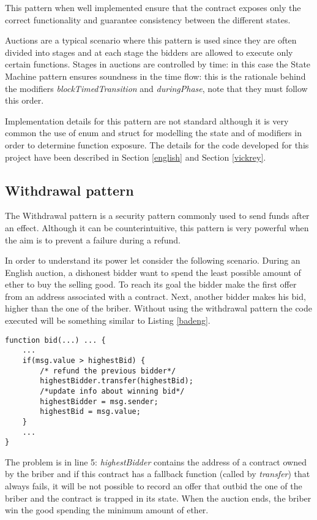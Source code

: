 \documentclass{article}
\begin{document}
This pattern when well implemented ensure that the contract exposes only the correct functionality and guarantee consistency between the different states.

Auctions are a typical scenario where this pattern is used since they are often divided into stages and at each stage the bidders are allowed to execute only certain functions. Stages in auctions are controlled by time: in this case the State Machine pattern ensures soundness in the time flow: this is the rationale behind the modifiers \textit{blockTimedTransition} and \textit{duringPhase}, note that they must follow this order.

Implementation details for this pattern are not standard although it is very common the use of enum and struct for modelling the state and of modifiers in order to determine function exposure. The details for the code developed for this project have been described in Section \ref{english} and Section \ref{vickrey}.
\subsection{Withdrawal pattern}\label{withdrawal}
The Withdrawal pattern is a security pattern commonly used to send funds after an effect. Although it can be counterintuitive, this pattern is very powerful when the aim is to prevent a failure during a refund.

In order to understand its power let consider the following scenario. 
During an English auction, a dishonest bidder want to spend the least possible amount of ether to buy the selling good. To reach its goal the bidder make the first offer from an address associated with a contract. Next, another bidder makes his bid, higher than the one of the briber. Without using the withdrawal pattern the code executed will be something similar to Listing \ref{badeng}.

\begin{lstlisting}[language=Solidity, caption={Buggy code that do not use the withdrawal pattern},captionpos=b, label=badeng]
 function bid(...) ... {
    ...
    if(msg.value > highestBid) {
        /* refund the previous bidder*/
        highestBidder.transfer(highestBid);
        /*update info about winning bid*/
        highestBidder = msg.sender;
        highestBid = msg.value;
    }
    ...   
}
\end{lstlisting}

The problem is in line 5: \textit{highestBidder} contains the address of a contract owned by the briber and if this contract has a fallback function (called by \textit{transfer}) that always fails, it will be not possible to record an offer that outbid the one of the briber and the contract is trapped in its state. When the auction ends, the briber win the good spending the minimum amount of ether.
\end{document}
